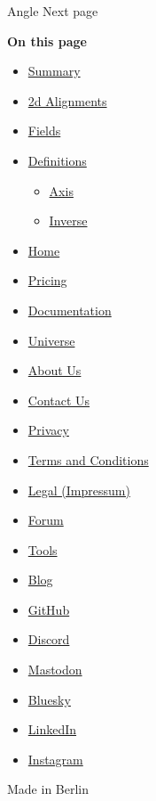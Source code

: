 { Angle } { Next page }

\textbf{On this page}

\begin{itemize}
\tightlist
\item
  \hyperref[summary]{Summary}
\item
  \hyperref[2d-alignments]{2d Alignments}
\item
  \hyperref[fields]{Fields}
\item
  \hyperref[definitions]{Definitions}

  \begin{itemize}
  \tightlist
  \item
    \hyperref[definitions-axis]{Axis}
  \item
    \hyperref[definitions-inv]{Inverse}
  \end{itemize}
\end{itemize}

\begin{itemize}
\tightlist
\item
  \href{/}{Home}
\item
  \href{/pricing/}{Pricing}
\item
  \href{/docs/}{Documentation}
\item
  \href{/universe/}{Universe}
\item
  \href{/about/}{About Us}
\item
  \href{/contact/}{Contact Us}
\item
  \href{/privacy/}{Privacy}
\item
  \href{https://typst.app/terms}{Terms and Conditions}
\item
  \href{/legal/}{Legal (Impressum)}
\end{itemize}

\begin{itemize}
\tightlist
\item
  \href{https://forum.typst.app}{Forum}
\item
  \href{/tools/}{Tools}
\item
  \href{/blog/}{Blog}
\item
  \href{https://github.com/typst/}{GitHub}
\item
  \href{https://discord.gg/2uDybryKPe}{Discord}
\item
  \href{https://mastodon.social/@typst}{Mastodon}
\item
  \href{https://bsky.app/profile/typst.app}{Bluesky}
\item
  \href{https://www.linkedin.com/company/typst/}{LinkedIn}
\item
  \href{https://instagram.com/typstapp/}{Instagram}
\end{itemize}

Made in Berlin
